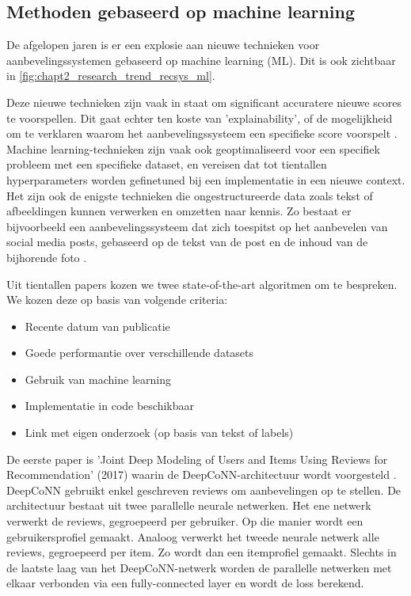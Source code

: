 \subsection{Methoden gebaseerd op machine learning}
\label{sec:chapt2_machine_learning_modellen}
De afgelopen jaren is er een explosie aan nieuwe technieken voor aanbevelingssystemen gebaseerd op machine learning (ML). Dit is ook zichtbaar in \autoref{fig:chapt2_research_trend_recsys_ml}.


 Deze nieuwe technieken zijn vaak in staat om significant accuratere nieuwe scores te voorspellen. Dit gaat echter ten koste van 'explainability', of de mogelijkheid om te verklaren waarom het aanbevelingssysteem een specifieke score voorspelt \cite{overzicht_technieken}. Machine learning-technieken zijn vaak ook geoptimaliseerd voor een specifiek probleem met een specifieke dataset, en vereisen dat tot tientallen hyperparameters worden gefinetuned bij een implementatie in een nieuwe context. Het zijn ook de enigste technieken die ongestructureerde data zoals tekst of afbeeldingen kunnen verwerken en omzetten naar kennis. Zo bestaat er bijvoorbeeld een aanbevelingssysteem dat zich toespitst op het aanbevelen van social media posts, gebaseerd op de tekst van de post en de inhoud van de bijhorende foto \cite{recsys_afbeeldingen_social_network}.

 Uit tientallen papers kozen we twee state-of-the-art algoritmen om te bespreken. We kozen deze op basis van volgende criteria:
\begin{itemize}
     \item Recente datum van publicatie
     \item Goede performantie over verschillende datasets
     \item Gebruik van machine learning
     \item Implementatie in code beschikbaar
     \item Link met eigen onderzoek (op basis van tekst of labels)
\end{itemize}

De eerste paper is 'Joint Deep Modeling of Users and Items Using Reviews for Recommendation' (2017) waarin de DeepCoNN-architectuur wordt voorgesteld \cite{deepconn}. DeepCoNN gebruikt enkel geschreven reviews om aanbevelingen op te stellen. De architectuur bestaat uit twee parallelle neurale netwerken. Het ene netwerk verwerkt de reviews, gegroepeerd per gebruiker. Op die manier wordt een gebruikersprofiel gemaakt. Analoog verwerkt het tweede neurale netwerk alle reviews, gegroepeerd per item. Zo wordt dan een itemprofiel gemaakt. Slechts in de laatste laag van het DeepCoNN-netwerk worden de parallelle netwerken met elkaar verbonden via een fully-connected layer en wordt de loss berekend.


